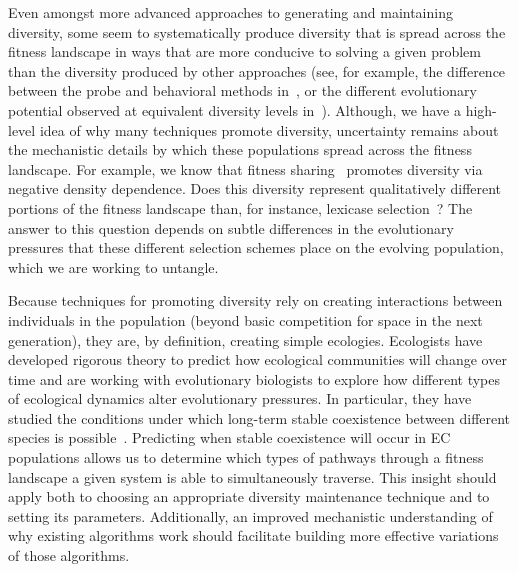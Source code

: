 Even amongst more advanced approaches to generating and maintaining diversity, some seem to systematically produce diversity that is spread across the fitness landscape in ways that are more conducive to solving a given problem than the diversity produced by other approaches (see, for example, the difference between the probe and behavioral methods in~\cite{mouret_using_2009}, or the different evolutionary potential observed at equivalent diversity levels in~\cite{walker_evolutionary_2012}). Although, we have a high-level idea of why many techniques promote diversity, uncertainty remains about the mechanistic details by which these populations spread across the fitness landscape.
For example, we know that fitness sharing~\cite{goldberg_genetic_1987} promotes diversity via negative density dependence. Does this diversity represent qualitatively different portions of the fitness landscape than, for instance, lexicase selection~\cite{spector_assessment_2012}?
The answer to this question depends on subtle differences in the evolutionary pressures that these different selection schemes place on the evolving population, which we are working to untangle.

Because techniques for promoting diversity rely on creating interactions between individuals in the population (beyond basic competition for space in the next generation),
they are, by definition, creating simple ecologies. Ecologists have developed rigorous theory to predict how ecological communities will change over time and are working with evolutionary biologists to explore how different types of ecological dynamics alter evolutionary pressures.
In particular, they have studied the conditions under which long-term stable coexistence between different species is possible~\cite{pacala_limiting_1994, chesson_mechanisms_2000,chase_ecological_2003,letten_linking_2017}. Predicting when stable coexistence will occur in EC populations allows us to determine which types of pathways through a fitness landscape a given system is able to simultaneously traverse.%
This insight should apply both to choosing an appropriate diversity maintenance technique and to setting its parameters.%
Additionally, an improved mechanistic understanding of why existing algorithms work should facilitate building more effective variations of those algorithms.

